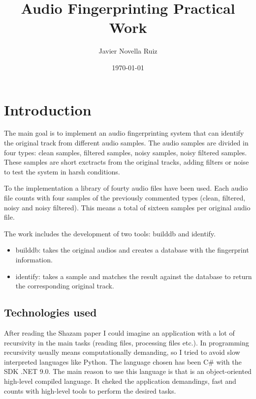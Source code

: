 \documentclass[11pt, a4paper]{article}
\title{Audio Fingerprinting Practical Work}
\author{Javier Novella Ruiz}
\date{\today}
\begin{document}
    

    \tableofcontents

    \newpage

    \section{Introduction}

    The main goal is to implement an audio fingerprinting system that can identify the original track from different audio samples.
    The audio samples are divided in four types: clean samples, filtered samples, noisy samples, noisy filtered samples. These samples
    are short exctracts from the original tracks, adding filters or noise to test the system in harsh conditions.

    \vspace{1em} To the implementation a library of fourty audio files have been used. Each audio file counts with four samples of the previously 
    commented types (clean, filtered, noisy and noisy filtered). This means a total of sixteen samples per original audio file.

    \vspace{1em} The work includes the development of two tools: builddb and identify.
    \begin{itemize}
        \item builddb: takes the original audios and creates a database with the fingerprint information.
        \item identify: takes a sample and matches the result against the database to return the corresponding original track.
    \end{itemize}

    \subsection{Technologies used}
    
    After reading the Shazam paper \cite{ShazamAlgorithmPaper} I could imagine an application with a lot of recursivity in the main tasks 
    (reading files, processing files etc.). In programming recursivity usually means computationally demanding, so I tried to avoid slow 
    interpreted languages like Python. The language chosen has been C\# \cite{PythonVsCSharp} with the SDK .NET 9.0. The main reason to use this 
    language is that is an object-oriented high-level compiled language. It cheked the application demandings, fast and counts with high-level 
    tools to perform the desired tasks.
\end{document}
